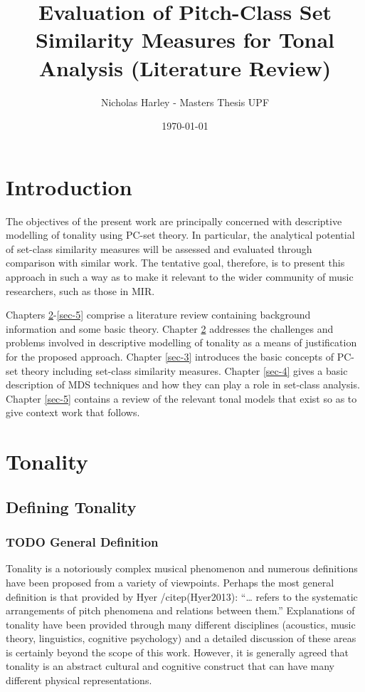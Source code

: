 \documentclass{article}
\title{Evaluation of Pitch-Class Set Similarity Measures for Tonal Analysis (Literature Review)}
\author{Nicholas Harley - Masters Thesis UPF}
\date{\today}
\begin{document}
\maketitle

\setcounter{tocdepth}{3}
\tableofcontents
\vspace*{1cm}

\section{Introduction}
\label{sec-1}

The objectives of the present work are principally concerned with
descriptive modelling of tonality using PC-set theory. In particular,
the analytical potential of set-class similarity measures will be
assessed and evaluated through comparison with similar work. The
tentative goal, therefore, is to present this approach in such a way
as to make it relevant to the wider community of music researchers,
such as those in MIR.

Chapters \ref{sec-2}-\ref{sec-5} comprise a literature
review containing background information and some basic
theory. Chapter \ref{sec-2} addresses the challenges and problems
involved in descriptive modelling of tonality as a means of
justification for the proposed approach. Chapter \ref{sec-3} introduces the basic concepts of PC-set theory including
set-class similarity measures. Chapter \ref{sec-4}
gives a basic description of MDS techniques and how they can play a
role in set-class analysis. Chapter \ref{sec-5}
contains a review of the relevant tonal models that exist so as to
give context work that follows.
\section{Tonality}
\label{sec-2}
\subsection{Defining Tonality}
\label{sec-2-1}
\subsubsection{\textbf{TODO} General Definition}
\label{sec-2-1-1}

Tonality is a notoriously complex musical phenomenon and numerous
definitions have been proposed from a variety of viewpoints. Perhaps
the most general definition is that provided by Hyer /citep(Hyer2013):
``\ldots{} refers to the systematic arrangements of pitch phenomena and
relations between them.'' Explanations of tonality have been provided
through many different disciplines (acoustics, music theory,
linguistics, cognitive psychology) and a detailed discussion of these
areas is certainly beyond the scope of this work. However, it is
generally agreed that tonality is an abstract cultural and cognitive
construct that can have many different physical representations.
\end{document}
